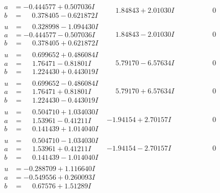 \documentclass[1p]{elsarticle_modified}
\theoremstyle{definition}
\begin{document}
$$\begin{array}{c|c|c}
\begin{aligned}
a &= -0.444577 + 0.507036 I \\
b &= \phantom{-}0.378405 - 0.621872 I\end{aligned}
 & \phantom{-}1.84843 + 2.01030 I & \phantom{-0.000000 } 0 \\ \hline\begin{aligned}
u &= \phantom{-}0.328998 - 1.094430 I \\
a &= -0.444577 - 0.507036 I \\
b &= \phantom{-}0.378405 + 0.621872 I\end{aligned}
 & \phantom{-}1.84843 - 2.01030 I & \phantom{-0.000000 } 0 \\ \hline\begin{aligned}
u &= \phantom{-}0.699652 + 0.486084 I \\
a &= \phantom{-}1.76471 - 0.81801 I \\
b &= \phantom{-}1.224430 + 0.443019 I\end{aligned}
 & \phantom{-}5.79170 - 6.57634 I & \phantom{-0.000000 } 0 \\ \hline\begin{aligned}
u &= \phantom{-}0.699652 - 0.486084 I \\
a &= \phantom{-}1.76471 + 0.81801 I \\
b &= \phantom{-}1.224430 - 0.443019 I\end{aligned}
 & \phantom{-}5.79170 + 6.57634 I & \phantom{-0.000000 } 0 \\ \hline\begin{aligned}
u &= \phantom{-}0.504710 + 1.034030 I \\
a &= \phantom{-}1.53961 - 0.41211 I \\
b &= \phantom{-}0.141439 + 1.014040 I\end{aligned}
 & -1.94154 + 2.70157 I & \phantom{-0.000000 } 0 \\ \hline\begin{aligned}
u &= \phantom{-}0.504710 - 1.034030 I \\
a &= \phantom{-}1.53961 + 0.41211 I \\
b &= \phantom{-}0.141439 - 1.014040 I\end{aligned}
 & -1.94154 - 2.70157 I & \phantom{-0.000000 } 0 \\ \hline\begin{aligned}
u &= -0.288709 + 1.116640 I \\
a &= -0.549556 + 0.260093 I \\
b &= \phantom{-}0.67576 + 1.51289 I\end{aligned}

\end{array}$$
\end{document}

